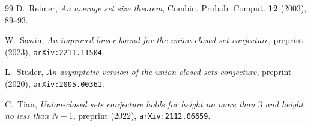 \documentclass[11pt,a4paper]{amsart}
\theoremstyle{plain}
\theoremstyle{definition}
\begin{document}
\begin{thebibliography}{99}
 D.~Reimer,
\emph{An average set size theorem},
Combin. Probab. Comput. \textbf{12} (2003), 89--93.

 W.~Sawin,
\emph{An improved lower bound for the union-closed set conjecture},
preprint (2023), \texttt{arXiv:2211.11504}.

 L.~Studer,
\emph{An asymptotic version of the union-closed sets conjecture},
preprint (2020), \texttt{arXiv:2005.00361}.

 C.~Tian,
\emph{Union-closed sets conjecture holds for height no more than $3$ and height
no less than $N-1$}, preprint (2022), \texttt{arXiv:2112.06659}.

\end{thebibliography}
\end{document}
